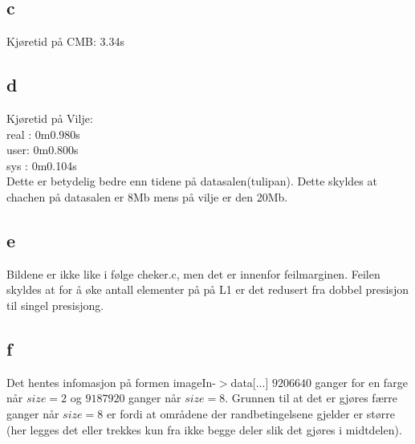 \documentclass[12pt, a4paper]{article} %
\begin{document}
\subsection*{c}
Kjøretid på CMB: 3.34s
\subsection*{d}
Kjøretid på Vilje:\\
real :   0m0.980s\\
user:    0m0.800s\\
sys :    0m0.104s\\

Dette er betydelig bedre enn tidene på datasalen(tulipan). Dette skyldes at chachen på datasalen er 8Mb mens på vilje er den 20Mb. 

\subsection*{e}
Bildene er ikke like i følge cheker.c, men det er innenfor feilmarginen. Feilen skyldes at for å øke antall elementer på på L1 er det redusert fra dobbel presisjon til singel presisjong.

\subsection*{f}
Det hentes infomasjon på formen imageIn-$>$data[...] $9206640$ ganger for en farge når $size=2$ og $9187920  $ ganger når $size=8$. Grunnen til at det er gjøres færre ganger når $size=8$ er fordi at områdene der randbetingelsene gjelder er større (her legges det eller trekkes kun fra ikke begge deler slik det gjøres i midtdelen).
\end{document}

